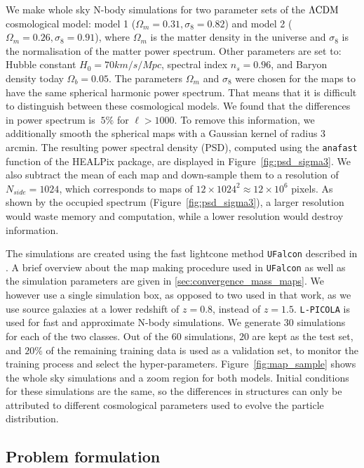 \documentclass[final,twocolumn,3p,times,sort&compress]{elsarticle}
\newcommand{\figref}[1]{Figure~\ref{fig:#1}}
\newcommand{\1}{\b{1}}              %
\newcommand{\0}{\b{0}}              %
\newcommand{\pkg}[1]{\texttt{#1}}
\begin{document}
We make whole sky N-body simulations for two parameter sets of the $\Lambda\rm{CDM}$ cosmological model: model 1 ($\Omega_m=0.31, \sigma_8=0.82$) and model 2 ($\Omega_m=0.26, \sigma_8=0.91$), where $\Omega_m$ is the matter density in the universe and $\sigma_8$ is the normalisation of the matter power spectrum.
Other parameters are set to: Hubble constant $H_0=70 km/s/Mpc$, spectral index $n_s=0.96$, and Baryon density today $\Omega_b=0.05$.
The parameters $\Omega_m$ and $\sigma_8$ were chosen for the maps to have the same spherical harmonic power spectrum.
That means that it is difficult to distinguish between these cosmological models.
We found that the differences in power spectrum is $~5\%$ for $\ell>1000$.
To remove this information, we additionally smooth the spherical maps with a Gaussian kernel of radius $3$ arcmin.
The resulting power spectral density (PSD), computed using the \texttt{anafast} function of the HEALPix package, are displayed in \figref{psd_sigma3}.
We also subtract the mean of each map and down-sample them to a resolution of $N_{side}=1024$, which corresponds to maps of $12 \times 1024^2 \approx 12 \times 10^6$ pixels.
As shown by the occupied spectrum (\figref{psd_sigma3}), a larger resolution would waste memory and computation, while a lower resolution would destroy information.

The simulations are created using the fast lightcone method \pkg{UFalcon} described in \citep{sgier2018fastgeneration}.
A brief overview about the map making procedure used in \pkg{UFalcon} as well as the simulation parameters are given in \ref{sec:convergence_mass_maps}.
We however use a single simulation box, as opposed to two used in that work, as we use source galaxies at a lower redshift of $z=0.8$, instead of $z=1.5$.
\pkg{L-PICOLA} \citep{howlett2015lpicola} is used for fast and approximate N-body simulations.
We generate $30$ simulations for each of the two classes.
Out of the $60$ simulations, $20$ are kept as the test set, and $20\%$ of the remaining training data is used as a validation set, to monitor the training process and select the hyper-parameters.
\figref{map_sample} shows the whole sky simulations and a zoom region for both models.
Initial conditions for these simulations are the same, so the differences in structures can only be attributed to different cosmological parameters used to evolve the particle distribution.

\subsection{Problem formulation}
\end{document}
